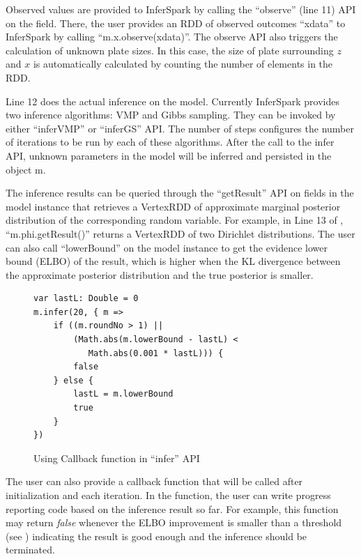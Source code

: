 Observed values are provided to InferSpark
by calling the ``{\sf observe}'' (line 11) API on the field.
There, the user provides an RDD of observed outcomes ``{\sf xdata}'' to InferSpark by calling
``{\sf m.x.observe(xdata)}''. The  {\sf observe} API also triggers
the calculation of unknown plate sizes.
In this case, the size of plate surrounding $z$ and $x$ is
automatically calculated by counting the number of elements in the RDD.


Line 12 does the actual inference on the model.
Currently InferSpark provides two inference algorithms: VMP and Gibbs sampling. 
They can be invoked by either ``{\sf inferVMP}'' or ``{\sf inferGS}'' API. The number
of steps configures the number of iterations to be run by each of these algorithms.
After the call to the infer API, unknown parameters in the model will be
inferred and persisted in the object {\sf m}.

The inference results can be queried through the ``{\sf getResult}''
API on fields in the model instance that retrieves a VertexRDD of approximate
marginal posterior distribution of the corresponding random variable. For
example, in Line 13 of , ``{\sf m.phi.getResult()}'' 
returns a VertexRDD of two Dirichlet distributions. 
The user can also call ``{\sf lowerBound}'' 
on the model instance to get the evidence lower bound (ELBO) of the result, 
which is higher when the KL divergence between the approximate posterior 
distribution and the true posterior is smaller. 

\begin{figure}[h]
\centering
\begin{lstlisting}
var lastL: Double = 0
m.infer(20, { m =>
	if ((m.roundNo > 1) || 
		(Math.abs(m.lowerBound - lastL) < 
		   Math.abs(0.001 * lastL))) {
		false
	} else {
		lastL = m.lowerBound
		true	
	}
})
\end{lstlisting}
\caption{Using Callback function in ``infer'' API}
\label{fig:two_coins_callback}
\end{figure}

The user can also provide a callback function that will be called after
initialization and each iteration. In the function, the user can write
progress reporting code based on the inference result so far. 
For example, this function may return {\em false} whenever
the ELBO improvement is smaller than a threshold 
(see ) indicating the result is good enough 
and the inference should be terminated. 

